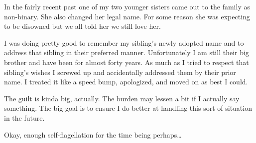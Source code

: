 In the fairly recent past one of my two younger sisters came out to the
family as non-binary. She also changed her legal name. For some reason
she was expecting to be disowned but we all told her we still love her.

I was doing pretty good to remember my sibling's newly adopted name and
to address that sibling in their preferred manner. Unfortunately I am
still their big brother and have been for almost forty years. As much as
I tried to respect that sibling's wishes I screwed up and accidentally
addressed them by their prior name. I treated it like a speed bump,
apologized, and moved on as best I could.

The guilt is kinda big, actually. The burden may lessen a bit if I
actually say something. The big goal is to ensure I do better at
handling this sort of situation in the future.

Okay, enough self-flagellation for the time being perhaps\ldots{}
